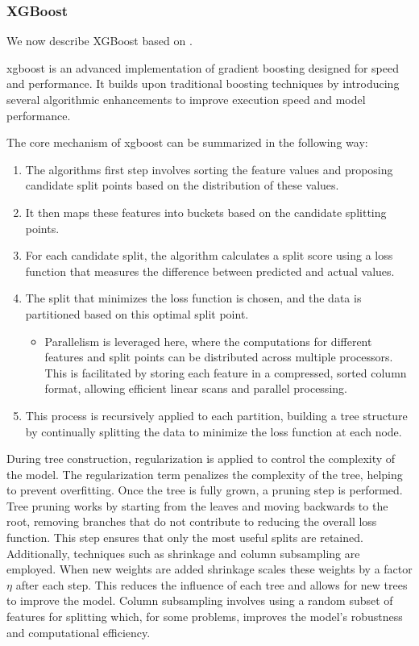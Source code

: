 \subsubsection{XGBoost}
We now describe XGBoost based on \citet{ChenGuestrin2016}.

\gls{xgboost} is an advanced implementation of gradient boosting designed for speed and performance. 
It builds upon traditional boosting techniques by introducing several algorithmic enhancements to improve execution speed and model performance.

The core mechanism of \gls{xgboost} can be summarized in the following way:
\begin{enumerate}
\item The algorithms first step involves sorting the feature values and proposing candidate split points based on the distribution of these values.
\item It then maps these features into buckets based on the candidate splitting points.
\item For each candidate split, the algorithm calculates a split score using a loss function that measures the difference between predicted and actual values.
\item The split that minimizes the loss function is chosen, and the data is partitioned based on this optimal split point. 
	\begin{itemize}
		\item Parallelism is leveraged here, where the computations for different features and split points can be distributed across multiple processors. 
		This is facilitated by storing each feature in a compressed, sorted column format, allowing efficient linear scans and parallel processing.
	\end{itemize}
\item This process is recursively applied to each partition, building a tree structure by continually splitting the data to minimize the loss function at each node.
\end{enumerate}
During tree construction, regularization is applied to control the complexity of the model. 
The regularization term penalizes the complexity of the tree, helping to prevent overfitting.
Once the tree is fully grown, a pruning step is performed. 
Tree pruning works by starting from the leaves and moving backwards to the root, removing branches that do not contribute to reducing the overall loss function. 
This step ensures that only the most useful splits are retained.
Additionally, techniques such as shrinkage and column subsampling are employed. 
When new weights are added shrinkage scales these weights by a factor $\eta$ after each step.
This reduces the influence of each tree and allows for new trees to improve the model.
Column subsampling involves using a random subset of features for splitting which, for some problems, improves the model's robustness and computational efficiency.
